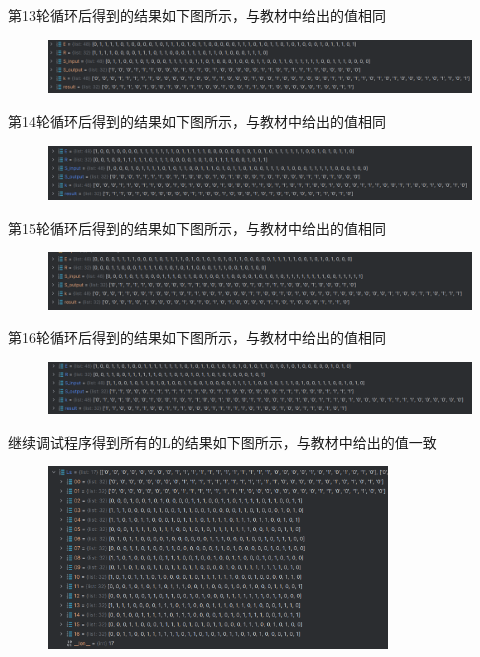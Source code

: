 \documentclass[a4paper,11pt,UTF8]{ctexart}
\newcommand{\bottomcaption}{%
\setlength{\abovecaptionskip}{6pt}%
\setlength{\belowcaptionskip}{6pt}%
\caption}
\newcommand{\xiaowuhao}{\fontsize{9pt}{\baselineskip}\selectfont}   %
\begin{document}
            第13轮循环后得到的结果如下图所示，与教材中给出的值相同
            \begin{figure}[H]
                \centering
                \includegraphics[width=15cm]{N13.png}
                \bottomcaption{\xiaowuhao{第13轮循环的结果}}
            \end{figure}
            第14轮循环后得到的结果如下图所示，与教材中给出的值相同
            \begin{figure}[H]
                \centering
                \includegraphics[width=15cm]{N14.png}
                \bottomcaption{\xiaowuhao{第14轮循环的结果}}
            \end{figure}
\newpage
            第15轮循环后得到的结果如下图所示，与教材中给出的值相同
            \begin{figure}[H]
                \centering
                \includegraphics[width=15cm]{N15.png}
                \bottomcaption{\xiaowuhao{第15轮循环的结果}}
            \end{figure}
            第16轮循环后得到的结果如下图所示，与教材中给出的值相同
            \begin{figure}[H]
                \centering
                \includegraphics[width=15cm]{N16.png}
                \bottomcaption{\xiaowuhao{第16轮循环的结果}}
            \end{figure}
            继续调试程序得到所有的L的结果如下图所示，与教材中给出的值一致
            \begin{figure}[H]
                \centering
                \includegraphics[width=9cm]{L.png}
                \bottomcaption{\xiaowuhao{L的值}}
            \end{figure}
\end{document}
